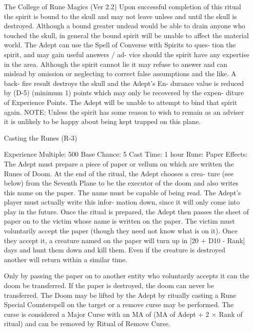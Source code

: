 \begin{Chapter}{The College of Rune Magics (Ver 2.2)}
Upon successful completion of this ritual the spirit 
is bound to the skull and may not leave unless and 
until  the  skull  is  destroyed.  Although  a  bound 
greater undead would be able to drain anyone who 
touched  the  skull,  in  general  the  bound  spirit  will 
be  unable  to  affect  the  material  world.  The  Adept 
can use the Spell of Converse with Spirits to ques-
tion  the  spirit,  and  may  gain  useful  answers  /  ad-
vice  should  the  spirit  have  any  expertise  in  the 
area. Although the spirit cannot lie it may refuse to 
answer and can mislead by omission or neglecting 
to  correct  false  assumptions  and  the  like.  A  back-
fire  result  destroys  the  skull  and  the  Adept’s  En-
durance  value  is  reduced  by  (D-5)  (minimum  1) 
points which may only be recovered by the expen-
diture  of  Experience  Points.  The  Adept  will  be 
unable  to  attempt  to  bind that  spirit again.  NOTE: 
Unless the spirit has some reason to wish to remain 
as an adviser it is unlikely to be happy about being 
kept trapped on this plane. 

Casting the Runes (R-3) 

Experience Multiple: 500 
Base Chance: 5%
Cast Time: 1 hour 
Rune: Paper 
Effects:  The  Adept  must  prepare  a  piece  of  paper 
or vellum on which are written the Runes of Doom. 
At the end of the ritual, the Adept chooses a crea-
ture  (see  below)  from  the  Seventh  Plane  to  be  the 
executor of the doom and also writes this name on 
the paper. The name must be capable of being read. 
The  Adept’s  player  must  actually  write  this  infor-
mation  down,  since  it  will  only  come  into  play  in 
the  future.  Once  the  ritual  is  prepared,  the  Adept 
then  passes  the  sheet  of  paper  on  to  the  victim 
whose  name  is  written  on  the  paper.  The  victim 
must  voluntarily  accept  the  paper  (though  they 
need not know what is on it). Once they accept it, a 
creature  named  on  the  paper  will  turn  up  in [20  + 
D10  -  Rank]  days  and  hunt  them  down  and  kill 
them. Even if the creature is destroyed another will 
return within a similar time. 

Only by passing the paper on to another entity who 
voluntarily  accepts it can the doom be  transferred. 
If  the  paper  is  destroyed,  the  doom  can  never  be 
transferred. The Doom may be lifted by the Adept 
by ritually casting a Rune Special Counterspell on 
the  target  or  a  remove  curse  may  be  performed. 
The curse is considered a Major Curse with an MA 
of (MA of Adept + 2 × Rank of ritual) and can be 
removed by Ritual of Remove Curse. 


\end{Chapter}
